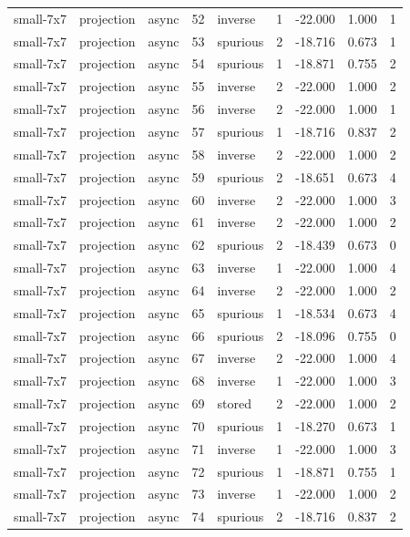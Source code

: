 \begin{tabular}{lllrlrrrr}
small-7x7 & projection & async & 52 & inverse & 1 & -22.000 & 1.000 & 1 \\
small-7x7 & projection & async & 53 & spurious & 2 & -18.716 & 0.673 & 1 \\
small-7x7 & projection & async & 54 & spurious & 1 & -18.871 & 0.755 & 2 \\
small-7x7 & projection & async & 55 & inverse & 2 & -22.000 & 1.000 & 2 \\
small-7x7 & projection & async & 56 & inverse & 2 & -22.000 & 1.000 & 1 \\
small-7x7 & projection & async & 57 & spurious & 1 & -18.716 & 0.837 & 2 \\
small-7x7 & projection & async & 58 & inverse & 2 & -22.000 & 1.000 & 2 \\
small-7x7 & projection & async & 59 & spurious & 2 & -18.651 & 0.673 & 4 \\
small-7x7 & projection & async & 60 & inverse & 2 & -22.000 & 1.000 & 3 \\
small-7x7 & projection & async & 61 & inverse & 2 & -22.000 & 1.000 & 2 \\
small-7x7 & projection & async & 62 & spurious & 2 & -18.439 & 0.673 & 0 \\
small-7x7 & projection & async & 63 & inverse & 1 & -22.000 & 1.000 & 4 \\
small-7x7 & projection & async & 64 & inverse & 2 & -22.000 & 1.000 & 2 \\
small-7x7 & projection & async & 65 & spurious & 1 & -18.534 & 0.673 & 4 \\
small-7x7 & projection & async & 66 & spurious & 2 & -18.096 & 0.755 & 0 \\
small-7x7 & projection & async & 67 & inverse & 2 & -22.000 & 1.000 & 4 \\
small-7x7 & projection & async & 68 & inverse & 1 & -22.000 & 1.000 & 3 \\
small-7x7 & projection & async & 69 & stored & 2 & -22.000 & 1.000 & 2 \\
small-7x7 & projection & async & 70 & spurious & 1 & -18.270 & 0.673 & 1 \\
small-7x7 & projection & async & 71 & inverse & 1 & -22.000 & 1.000 & 3 \\
small-7x7 & projection & async & 72 & spurious & 1 & -18.871 & 0.755 & 1 \\
small-7x7 & projection & async & 73 & inverse & 1 & -22.000 & 1.000 & 2 \\
small-7x7 & projection & async & 74 & spurious & 2 & -18.716 & 0.837 & 2 \\

\end{tabular}
